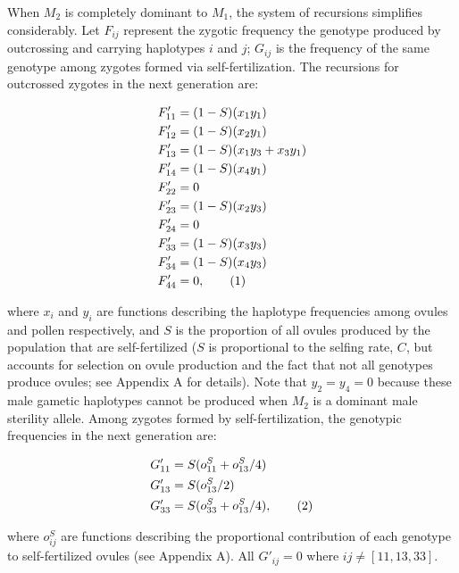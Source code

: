 \documentclass{article}
\newcommand\numberthis{\addtocounter{equation}{1}\tag{\theequation}}
\begin{document}
When $M_2$ is completely dominant to $M_1$, the system of recursions simplifies considerably. Let $F_{ij}$ represent the zygotic frequency the genotype produced by outcrossing and carrying haplotypes $i$ and $j$; $G_{ij}$ is the frequency of the same genotype among zygotes formed via self-fertilization. The recursions for outcrossed zygotes in the next generation are:
\begin{linenomath}\begin{align*} \label{eq:FprGyn}
    F'_{11} &= (1 - S) (x_1 y_1)  \\
    F'_{12} &= (1 - S) (x_2 y_1)  \\
    F'_{13} &= (1 - S) (x_1 y_3 + x_3 y_1)  \\
    F'_{14} &= (1 - S) (x_4 y_1)  \\
    F'_{22} &= 0 \\
    F'_{23} &= (1 - S) (x_2 y_3)  \\
    F'_{24} &= 0 \\
    F'_{33} &= (1 - S) (x_3 y_3)  \\
    F'_{34} &= (1 - S) (x_4 y_3)  \\
    F'_{44} &= 0, \numberthis
\end{align*}\end{linenomath}

\noindent where $x_{i}$ and $y_{i}$ are functions describing the haplotype frequencies among ovules and pollen respectively, and $S$ is the proportion of all ovules produced by the population that are self-fertilized ($S$ is proportional to the selfing rate, $C$, but accounts for selection on ovule production and the fact that not all genotypes produce ovules; see Appendix A for details). Note that $y_2=y_4=0$ because these male gametic haplotypes cannot be produced when $M_2$ is a dominant male sterility allele. Among zygotes formed by self-fertilization, the genotypic frequencies in the next generation are: 
\begin{linenomath}\begin{align*} \label{eq:GprGyn}
    G'_{11} &= S (o^S_{11} + o^S_{13}/4) \\
    G'_{13} &= S (o^S_{13}/2) \\
    G'_{33} &= S (o^S_{33} + o^S_{13}/4), \numberthis
\end{align*} \end{linenomath}

\noindent where $o^S_{ij}$ are functions describing the proportional contribution of each genotype to self-fertilized ovules (see Appendix A). All $G'_{ij} = 0$ where $ij \neq [11,13,33]$. 
\end{document}
